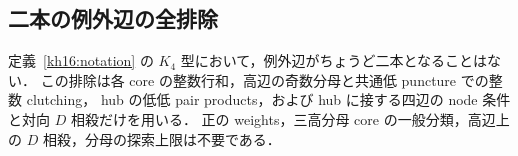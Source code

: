 \subsection{二本の例外辺の全排除}
\label{kt17:section}

\begin{theorem}
\label{kt17:no-two-exceptions}
定義~\ref{kh16:notation} の $K_4$ 型において，例外辺がちょうど二本となることはない．
この排除は各 core の整数行和，高辺の奇数分母と共通低 puncture での整数 clutching，
hub の低低 pair products，および hub に接する四辺の node 条件と対向 $D$ 相殺だけを用いる．
正の weights，三高分母 core の一般分類，高辺上の $D$ 相殺，分母の探索上限は不要である．
\end{theorem}

